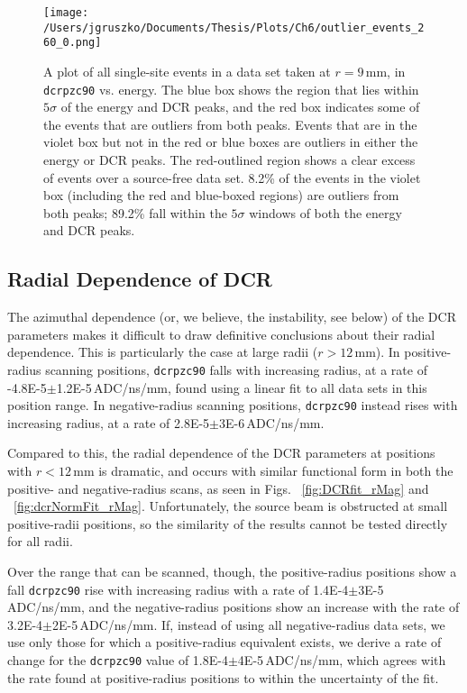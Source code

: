 \begin{figure}[]
 \centering
 \texttt{[image: /Users/jgruszko/Documents/Thesis/Plots/Ch6/outlier\_events\_260\_0.png]}
 \caption[DCR vs. energy in a data set, showing outlier events]{A plot of all single-site events in a data set taken at $r=9$\,mm, in {\tt dcrpzc90} vs. energy. The blue box shows the region that lies within $5\sigma$ of the energy and DCR peaks, and the red box indicates some of the events that are outliers from both peaks. Events that are in the violet box but not in the red or blue boxes are outliers in either the energy or DCR peaks. The red-outlined region shows a clear excess of events over a source-free data set. 8.2\% of the events in the violet box (including the red and blue-boxed regions) are outliers from both peaks; 89.2\% fall within the $5\sigma$ windows of both the energy and DCR peaks.} 
 \label{fig:outliers}
\end{figure}


\subsection{Radial Dependence of DCR}
The azimuthal dependence (or, we believe, the instability, see below) of the DCR parameters makes it difficult to draw definitive conclusions about their radial dependence. This is particularly the case at large radii ($r>12$\,mm). In positive-radius scanning positions, {\tt dcrpzc90} falls with increasing radius, at a rate of -4.8E-5$\pm$1.2E-5\,ADC/ns/mm, found using a linear fit to all data sets in this position range. In negative-radius scanning positions, {\tt dcrpzc90} instead rises with increasing radius, at a rate of 2.8E-5$\pm$3E-6\,ADC/ns/mm. 

Compared to this, the radial dependence of the DCR parameters at positions with $r<12$\,mm is dramatic, and occurs with similar functional form in both the positive- and negative-radius scans, as seen in Figs. ~\ref{fig:DCRfit_rMag} and ~\ref{fig:dcrNormFit_rMag}. Unfortunately, the source beam is obstructed at small positive-radii positions, so the similarity of the results cannot be tested directly for all radii. 

Over the range that can be scanned, though, the positive-radius positions show a fall {\tt dcrpzc90} rise with increasing radius with a rate of 1.4E-4$\pm$3E-5\,ADC/ns/mm, and the negative-radius positions show an increase with the rate of 3.2E-4$\pm$2E-5\,ADC/ns/mm. If, instead of using all negative-radius data sets, we use only those for which a positive-radius equivalent exists, we derive a rate of change for the {\tt dcrpzc90} value of 1.8E-4$\pm$4E-5\,ADC/ns/mm, which agrees with the rate found at positive-radius positions to within the uncertainty of the fit. 


